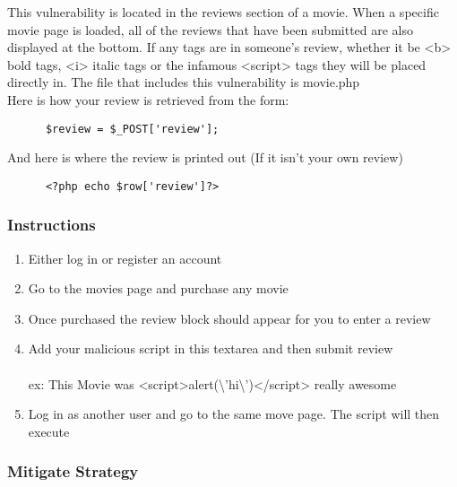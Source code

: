 \documentclass[titlepage]{article}
\begin{document}
      This vulnerability is located in the reviews section of a movie. When a specific movie page is loaded, all of the reviews that have been submitted are also displayed at the bottom. If any tags are in someone's review, whether it be <b> bold tags, <i> italic tags or the infamous <script> tags they will be placed directly in. The file that includes this vulnerability is movie.php\\

      Here is how your review is retrieved from the form:

      \begin{lstlisting}
      $review = $_POST['review'];
      \end{lstlisting}

      And here is where the review is printed out (If it isn't your own review)

      \begin{lstlisting}
      <?php echo $row['review']?>
      \end{lstlisting}


      \subsubsection{Instructions} %
      \label{ssub:xxs_stored_instructions}
      
      \begin{enumerate}
         \item Either log in or register an account
         \item Go to the movies page and purchase any movie
         \item Once purchased the review block should appear for you to enter a review
         \item Add your malicious script in this textarea and then submit review\\\\
         ex: This Movie was <script>alert(\textbackslash'hi\textbackslash')</script> really awesome
         \item Log in as another user and go to the same move page. The script will then execute
      \end{enumerate}


      \subsubsection{Mitigate Strategy} %
      \label{ssub:xxs_stored_mitigate_strategy}
      
\end{document}
